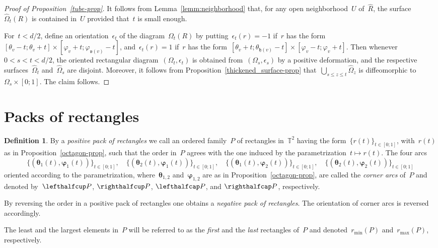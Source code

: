 \documentclass{amsart}
\def\cabl#1{\lefthalfcup#1}
\def\cabr#1{\righthalfcup#1}
\def\catl#1{\lefthalfcap#1}
\def\catr#1{\righthalfcap#1}
\theoremstyle{theorem}
\theoremstyle{remark}
\theoremstyle{definition}
\newtheorem{defi}[theo]{Definition}
\numberwithin{equation}{section}
\numberwithin{figure}{section}
\begin{document}
\begin{proof}[Proof of Proposition~\ref{tube-prop}]
It follows from Lemma~\ref{lemm:neighborhood} that, for any open neighborhood~$U$ of~$\widehat R$,
the surface~$\widehat\Omega_t(R)$ is contained in~$U$ provided that~$t$ is small enough.

For~$t<d/2$, define an orientation~$\epsilon_t$ of the diagram~$\Omega_t(R)$ by putting~$\epsilon_t(r)=-1$
if~$r$ has the form~$[\theta_v-t;\theta_v+t]\times[\varphi_v+t;\varphi_{\mathfrak v(v)}-t]$, and~$\epsilon_t(r)=1$
if~$r$ has the form~$[\theta_v+t;\theta_{\mathfrak h(v)}-t]\times[\varphi_v-t;\varphi_v+t]$.
Then whenever~$0<s<t<d/2$, the oriented rectangular diagram~$(\Omega_t,\epsilon_t)$
is obtained from~$(\Omega_s,\epsilon_s)$ by a positive deformation, and the respective
surfaces~$\widehat\Omega_t$ and~$\widehat\Omega_s$ are disjoint.
Moreover, it follows from Proposition~\ref{thickened_surface-prop} that~$\bigcup_{s\leqslant z\leqslant t}\widehat\Omega_z$
is diffeomorphic to~$\Omega_s\times[0;1]$. The claim follows.
\end{proof}

\section{Packs of rectangles}\label{pack-sec}
\begin{defi}\label{pack-rect-def}
By a \emph{positive pack of rectangles} we call an ordered family~$P$
of rectangles in~$\mathbb T^2$ having the form~$\{r(t)\}_{t\in[0;1]}$,
with~$r(t)$ as in Proposition~\ref{octagon-prop}, such that
the order in~$P$ agrees with the one induced by the parametrization~$t\mapsto r(t)$.
The four arcs
$$\{(\boldsymbol\theta_1(t),\boldsymbol\varphi_1(t))\}_{t\in[0;1]},\quad
\{(\boldsymbol\theta_2(t),\boldsymbol\varphi_1(t))\}_{t\in[0;1]},\quad
\{(\boldsymbol\theta_1(t),\boldsymbol\varphi_2(t))\}_{t\in[0;1]},\quad
\{(\boldsymbol\theta_2(t),\boldsymbol\varphi_2(t))\}_{t\in[0;1]}$$
oriented according to the parametrization, where~$\boldsymbol\theta_{1,2}$ and~$\boldsymbol\varphi_{1,2}$
are as in Proposition~\ref{octagon-prop}, are called the \emph{corner arcs} of~$P$
and denoted by~$\cabl P$, $\cabr P$,
$\catl P$, and $\catr P$,
respectively.

By reversing the order in a positive pack of rectangles one obtains a \emph{negative
pack of rectangles}. The orientation of corner arcs is reversed accordingly.

The least and the largest elements in~$P$ will be referred to as the \emph{first}
and the \emph{last} rectangles of~$P$ and denoted~$r_{\mathrm{min}}(P)$
and~$r_{\mathrm{max}}(P)$, respectively.
\end{defi}
\end{document}
